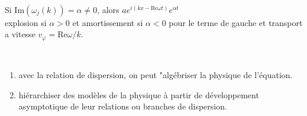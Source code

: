 \documentclass[12pt,a4paper]{article}
\begin{document}
	\begin{rmq}
		$ $\\
		\begin{minipage}{17cm}
			Si $\mathrm{Im}(\omega_j(k)) = \alpha \not = 0$, alors $ae^{i(kx-\mathrm{Re}\omega t)}e^{\alpha t}$\\
			explosion si $\alpha >0$ et amortissement si $\alpha <0$ pour le terme de gauche et transport a vitesse $v_\varphi = \mathrm{Re}\omega/k$.
		\end{minipage}
	\end{rmq}
	\begin{rmq}
		$ $\\
		\begin{minipage}{17cm}
			\begin{enumerate}[label=\textbullet]
				\item avec la relation de dispersion, on peut "algébriser la physique de l'équation.
				\item  hiérarchiser des modèles de la physique à partir de développement asymptotique de leur relations ou branches de dispersion.
			\end{enumerate}
		\end{minipage}
	\end{rmq}
	
\end{document}
